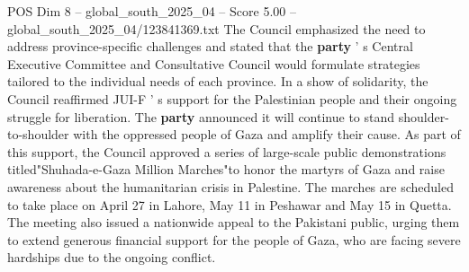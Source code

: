 \begin{textsample}{POS Dim 8 – global\_south\_2025\_04 – Score 5.00 – global\_south\_2025\_04/123841369.txt}
The Council emphasized the need to address province-specific challenges and stated that the \textbf{party} ' s Central Executive Committee and Consultative Council would formulate strategies tailored to the individual needs of each province.
In a show of solidarity, the Council reaffirmed JUI-F ' s support for the Palestinian people and their ongoing struggle for liberation.
The \textbf{party} announced it will continue to stand shoulder-to-shoulder with the oppressed people of Gaza and amplify their cause.
As part of this support, the Council approved a series of large-scale public demonstrations titled"Shuhada-e-Gaza Million Marches"to honor the martyrs of Gaza and raise awareness about the humanitarian crisis in Palestine.
The marches are scheduled to take place on April 27 in Lahore, May 11 in Peshawar and May 15 in Quetta.
The meeting also issued a nationwide appeal to the Pakistani public, urging them to extend generous financial support for the people of Gaza, who are facing severe hardships due to the ongoing conflict.

\end{textsample}
